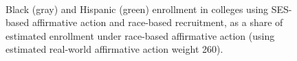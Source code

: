 \begin{figure}[p]
  \centering
   \\
  \caption{Black (\colorbox{sns-gray}{gray}) and Hispanic (\colorbox{sns-green}{green}) enrollment in colleges using SES-based affirmative action and race-based recruitment, as a share of estimated enrollment under race-based affirmative action (using estimated real-world affirmative action weight 260).}
  \label{fig:2}
\end{figure}

